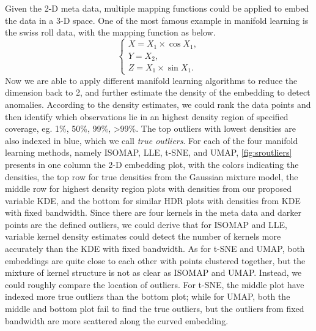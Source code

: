\documentclass[11pt,a4paper,]{article}
\begin{document}
Given the 2-D meta data, multiple mapping functions could be applied to embed the data in a 3-D space. One of the most famous example in manifold learning is the swiss roll data, with the mapping function as below.
\[
\left\{ 
\begin{array}{lcl}
X = X_1 \times \cos{X_1}, \\
Y = X_2, \\
Z = X_1 \times \sin{X_1}.
\end{array}
\right.
\]
Now we are able to apply different manifold learning algorithms to reduce the dimension back to 2, and further estimate the density of the embedding to detect anomalies. According to the density estimates, we could rank the data points and then identify which observations lie in an highest density region of specified coverage, eg. 1\%, 50\%, 99\%, \textgreater99\%. The top outliers with lowest densities are also indexed in blue, which we call \emph{true outliers}. For each of the four manifold learning methods, namely ISOMAP, LLE, t-SNE, and UMAP, \autoref{fig:sroutliers} presents in one column the 2-D embedding plot, with the colors indicating the densities, the top row for true densities from the Gaussian mixture model, the middle row for highest density region plots with densities from our proposed variable KDE, and the bottom for similar HDR plots with densities from KDE with fixed bandwidth. Since there are four kernels in the meta data and darker points are the defined outliers, we could derive that for ISOMAP and LLE, variable kernel density estimates could detect the number of kernels more accurately than the KDE with fixed bandwidth. As for t-SNE and UMAP, both embeddings are quite close to each other with points clustered together, but the mixture of kernel structure is not as clear as ISOMAP and UMAP. Instead, we could roughly compare the location of outliers. For t-SNE, the middle plot have indexed more true outliers than the bottom plot; while for UMAP, both the middle and bottom plot fail to find the true outliers, but the outliers from fixed bandwidth are more scattered along the curved embedding.
\end{document}
